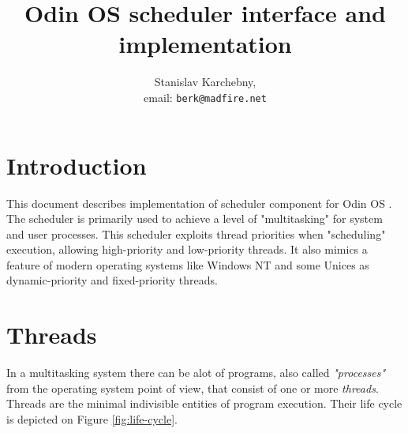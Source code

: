 \documentclass[onecolumn]{article}
\begin{document}
\title{\Large\bf Odin OS scheduler interface and implementation}
\author{Stanislav Karchebny, \\
        email: \texttt{berk@madfire.net}}
\maketitle



\section{Introduction}
\label{sec-intro}

\par This document describes implementation of scheduler component for Odin OS \cite{odin}.
The scheduler is primarily used to achieve a level of "multitasking" for system and user processes.
This scheduler exploits thread priorities when "scheduling" execution, allowing high-priority and
low-priority threads. It also mimics a feature of modern operating systems like Windows NT \cite{winnt}
and some Unices as dynamic-priority and fixed-priority threads.



\section{Threads}
\label{sec-threads}

\par In a multitasking system there can be alot of
programs, also called \emph{"processes"} from the operating system point of view, that consist of one or
more \emph{threads}. Threads are the minimal indivisible entities of program execution. Their life cycle
is depicted on Figure \ref{fig:life-cycle}.
\end{document}
